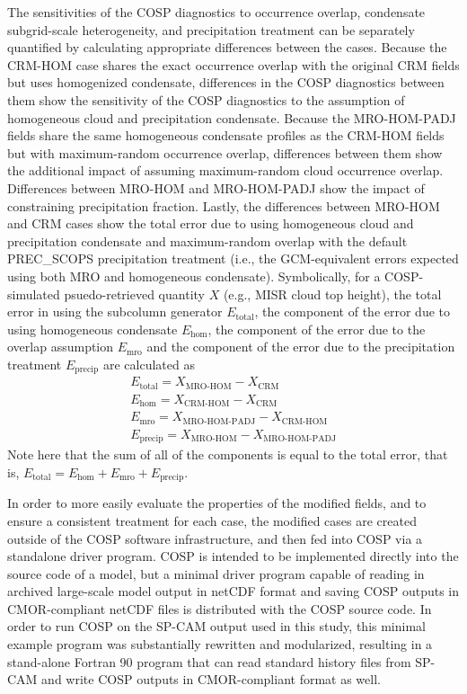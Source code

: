 The sensitivities of the COSP diagnostics to occurrence overlap,
condensate subgrid-scale heterogeneity, and precipitation treatment can
be separately quantified by calculating appropriate differences between
the cases. Because the CRM-HOM case shares the exact occurrence overlap
with the original CRM fields but uses homogenized condensate,
differences in the COSP diagnostics between them show the sensitivity of
the COSP diagnostics to the assumption of homogeneous cloud and
precipitation condensate. Because the MRO-HOM-PADJ fields share the same
homogeneous condensate profiles as the CRM-HOM fields but with
maximum-random occurrence overlap, differences between them show the
additional impact of assuming maximum-random cloud occurrence overlap.
Differences between MRO-HOM and MRO-HOM-PADJ show the impact of
constraining precipitation fraction. Lastly, the differences between
MRO-HOM and CRM cases show the total error due to using homogeneous
cloud and precipitation condensate and maximum-random overlap with the
default PREC\_SCOPS precipitation treatment (i.e., the GCM-equivalent
errors expected using both MRO and homogeneous condensate).
Symbolically, for a COSP-simulated psuedo-retrieved quantity \(X\)
(e.g., MISR cloud top height), the total error in using the subcolumn
generator \(E_\textrm{total}\), the component of the error due to using
homogeneous condensate \(E_\textrm{hom}\), the component of the error
due to the overlap assumption \(E_\textrm{mro}\) and the component of
the error due to the precipitation treatment \(E_\textrm{precip}\) are
calculated as \[\begin{gathered} 
    E_\textrm{total} = X_\textrm{MRO-HOM} - X_\textrm{CRM} \\
    E_\textrm{hom} = X_\textrm{CRM-HOM} - X_\textrm{CRM} \\
    E_\textrm{mro} = X_\textrm{MRO-HOM-PADJ} - X_\textrm{CRM-HOM} \\
    E_\textrm{precip} = X_\textrm{MRO-HOM} - X_\textrm{MRO-HOM-PADJ}
\end{gathered}\] Note here that the sum of all of the components is
equal to the total error, that is,
\(E_\textrm{total} = E_\textrm{hom} + E_\textrm{mro} + E_\textrm{precip}\).

In order to more easily evaluate the properties of the modified fields,
and to ensure a consistent treatment for each case, the modified cases
are created outside of the COSP software infrastructure, and then fed
into COSP via a standalone driver program. COSP is intended to be
implemented directly into the source code of a model, but a minimal
driver program capable of reading in archived large-scale model output
in netCDF format and saving COSP outputs in CMOR-compliant netCDF files
is distributed with the COSP source code. In order to run COSP on the
SP-CAM output used in this study, this minimal example program was
substantially rewritten and modularized, resulting in a stand-alone
Fortran 90 program that can read standard history files from SP-CAM and
write COSP outputs in CMOR-compliant format as well.

